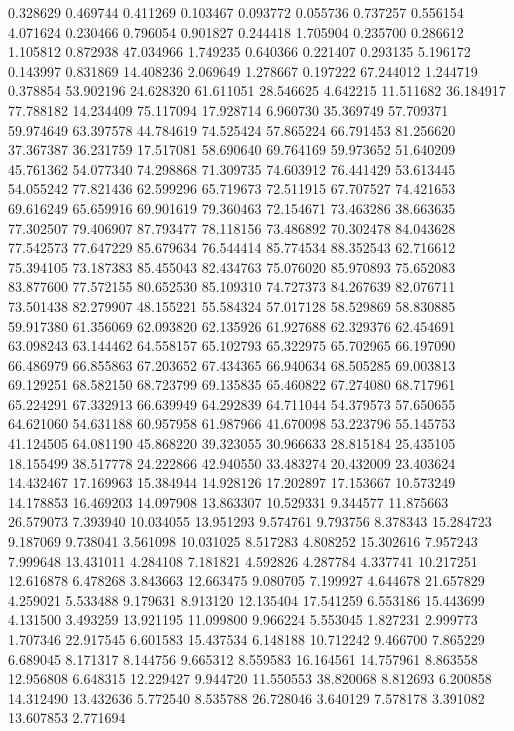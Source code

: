 0.328629
0.469744
0.411269
0.103467
0.093772
0.055736
0.737257
0.556154
4.071624
0.230466
0.796054
0.901827
0.244418
1.705904
0.235700
0.286612
1.105812
0.872938
47.034966
1.749235
0.640366
0.221407
0.293135
5.196172
0.143997
0.831869
14.408236
2.069649
1.278667
0.197222
67.244012
1.244719
0.378854
53.902196
24.628320
61.611051
28.546625
4.642215
11.511682
36.184917
77.788182
14.234409
75.117094
17.928714
6.960730
35.369749
57.709371
59.974649
63.397578
44.784619
74.525424
57.865224
66.791453
81.256620
37.367387
36.231759
17.517081
58.690640
69.764169
59.973652
51.640209
45.761362
54.077340
74.298868
71.309735
74.603912
76.441429
53.613445
54.055242
77.821436
62.599296
65.719673
72.511915
67.707527
74.421653
69.616249
65.659916
69.901619
79.360463
72.154671
73.463286
38.663635
77.302507
79.406907
87.793477
78.118156
73.486892
70.302478
84.043628
77.542573
77.647229
85.679634
76.544414
85.774534
88.352543
62.716612
75.394105
73.187383
85.455043
82.434763
75.076020
85.970893
75.652083
83.877600
77.572155
80.652530
85.109310
74.727373
84.267639
82.076711
73.501438
82.279907
48.155221
55.584324
57.017128
58.529869
58.830885
59.917380
61.356069
62.093820
62.135926
61.927688
62.329376
62.454691
63.098243
63.144462
64.558157
65.102793
65.322975
65.702965
66.197090
66.486979
66.855863
67.203652
67.434365
66.940634
68.505285
69.003813
69.129251
68.582150
68.723799
69.135835
65.460822
67.274080
68.717961
65.224291
67.332913
66.639949
64.292839
64.711044
54.379573
57.650655
64.621060
54.631188
60.957958
61.987966
41.670098
53.223796
55.145753
41.124505
64.081190
45.868220
39.323055
30.966633
28.815184
25.435105
18.155499
38.517778
24.222866
42.940550
33.483274
20.432009
23.403624
14.432467
17.169963
15.384944
14.928126
17.202897
17.153667
10.573249
14.178853
16.469203
14.097908
13.863307
10.529331
9.344577
11.875663
26.579073
7.393940
10.034055
13.951293
9.574761
9.793756
8.378343
15.284723
9.187069
9.738041
3.561098
10.031025
8.517283
4.808252
15.302616
7.957243
7.999648
13.431011
4.284108
7.181821
4.592826
4.287784
4.337741
10.217251
12.616878
6.478268
3.843663
12.663475
9.080705
7.199927
4.644678
21.657829
4.259021
5.533488
9.179631
8.913120
12.135404
17.541259
6.553186
15.443699
4.131500
3.493259
13.921195
11.099800
9.966224
5.553045
1.827231
2.999773
1.707346
22.917545
6.601583
15.437534
6.148188
10.712242
9.466700
7.865229
6.689045
8.171317
8.144756
9.665312
8.559583
16.164561
14.757961
8.863558
12.956808
6.648315
12.229427
9.944720
11.550553
38.820068
8.812693
6.200858
14.312490
13.432636
5.772540
8.535788
26.728046
3.640129
7.578178
3.391082
13.607853
2.771694
